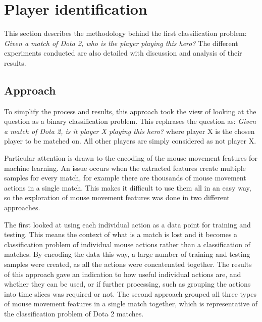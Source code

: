 \documentclass[Report.tex]{subfiles}
\begin{document}
\section{Player identification}\label{sec:game-classification}
This section describes the methodology behind the first classification problem: \textit{Given a match of Dota 2, who is the player playing this hero?} The different experiments conducted are also detailed with discussion and analysis of their results. 



\subsection{Approach}\label{sec:game-approach}
To simplify the process and results, this approach took the view of looking at the question as a binary classification problem. This rephrases the question as: \textit{Given a match of Dota 2, is it player X playing this hero?} where player X is the chosen player to be matched on. All other players are simply considered as not player X. 

Particular attention is drawn to the encoding of the mouse movement features for machine learning. An issue occurs when the extracted features create multiple samples for every match, for example there are thousands of mouse movement actions in a single match. This makes it difficult to use them all in an easy way, so the exploration of mouse movement features was done in two different approaches. 

The first looked at using each individual action as a data point for training and testing. This means the context of what is a match is lost and it becomes a classification problem of individual mouse actions rather than a classification of matches. By encoding the data this way, a large number of training and testing samples were created, as all the actions were concatenated together. The results of this approach gave an indication to how useful individual actions are, and whether they can be used, or if further processing, such as grouping the actions into time slices was required or not. The second approach grouped all three types of mouse movement features in a single match together, which is representative of the classification problem of Dota 2 matches. 

\end{document}
